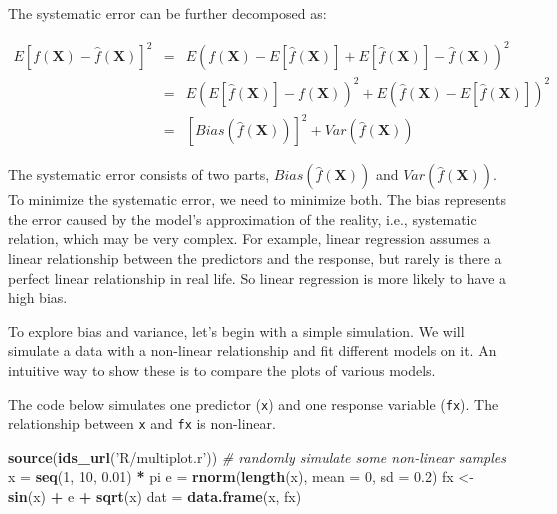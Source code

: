 \documentclass[12pt,]{krantz}
\makeatletter
\newenvironment{Shaded}{\begin{snugshade}}{\end{snugshade}}
\newcommand{\KeywordTok}[1]{\textcolor[rgb]{0.27,0.27,0.27}{\textbf{#1}}}
\newcommand{\DataTypeTok}[1]{\textcolor[rgb]{0.27,0.27,0.27}{#1}}
\newcommand{\DecValTok}[1]{\textcolor[rgb]{0.06,0.06,0.06}{#1}}
\newcommand{\FloatTok}[1]{\textcolor[rgb]{0.06,0.06,0.06}{#1}}
\newcommand{\StringTok}[1]{\textcolor[rgb]{0.5,0.5,0.5}{#1}}
\newcommand{\CommentTok}[1]{\textcolor[rgb]{0.37,0.37,0.37}{\textit{#1}}}
\newcommand{\OperatorTok}[1]{\textcolor[rgb]{0.43,0.43,0.43}{\textbf{#1}}}
\newcommand{\NormalTok}[1]{#1}
\newenvironment{kframe}{%
\medskip{}
\setlength{\fboxsep}{.8em}
 \def\at@end@of@kframe{}%
 \ifinner\ifhmode%
  \def\at@end@of@kframe{\end{minipage}}%
  \begin{minipage}{\columnwidth}%
 \fi\fi%
 \def\FrameCommand##1{\hskip\@totalleftmargin \hskip-\fboxsep
 \colorbox{shadecolor}{##1}\hskip-\fboxsep
     \hskip-\linewidth \hskip-\@totalleftmargin \hskip\columnwidth}%
 \MakeFramed {\advance\hsize-\width
   \@totalleftmargin\z@ \linewidth\hsize
   \@setminipage}}%
 {\par\unskip\endMakeFramed%
 \at@end@of@kframe}
\renewenvironment{Shaded}{\begin{kframe}}{\end{kframe}}
\theoremstyle{definition}
\theoremstyle{definition}
\theoremstyle{definition}
\theoremstyle{remark}
\makeatother
\begin{document}
The systematic error can be further decomposed as:

\[
\begin{array}{ccc}
E[f(\mathbf{X})-\hat{f}(\mathbf{X})]^{2} & = & E\left(f(\mathbf{X})-E[\hat{f}(\mathbf{X})]+E[\hat{f}(\mathbf{X})]-\hat{f}(\mathbf{X})\right)^{2}\\
 & = & E\left(E[\hat{f}(\mathbf{X})]-f(\mathbf{X})\right)^{2}+E\left(\hat{f}(\mathbf{X})-E[\hat{f}(\mathbf{X})]\right)^{2}\\
 & = & [Bias(\hat{f}(\mathbf{X}))]^{2}+Var(\hat{f}(\mathbf{X}))
\end{array}
\]

The systematic error consists of two parts,
\(Bias(\hat{f}(\mathbf{X}))\) and \(Var (\hat{f}(\mathbf{X}))\). To
minimize the systematic error, we need to minimize both. The bias
represents the error caused by the model's approximation of the reality,
i.e., systematic relation, which may be very complex. For example,
linear regression assumes a linear relationship between the predictors
and the response, but rarely is there a perfect linear relationship in
real life. So linear regression is more likely to have a high bias.

To explore bias and variance, let's begin with a simple simulation. We
will simulate a data with a non-linear relationship and fit different
models on it. An intuitive way to show these is to compare the plots of
various models.

The code below simulates one predictor (\texttt{x}) and one response
variable (\texttt{fx}). The relationship between \texttt{x} and
\texttt{fx} is non-linear.

\begin{Shaded}
\begin{Highlighting}[]
\KeywordTok{source}\NormalTok{(}\KeywordTok{ids_url}\NormalTok{(}\StringTok{'R/multiplot.r'}\NormalTok{))}
\CommentTok{# randomly simulate some non-linear samples}
\NormalTok{x =}\StringTok{ }\KeywordTok{seq}\NormalTok{(}\DecValTok{1}\NormalTok{, }\DecValTok{10}\NormalTok{, }\FloatTok{0.01}\NormalTok{) }\OperatorTok{*}\StringTok{ }\NormalTok{pi}
\NormalTok{e =}\StringTok{ }\KeywordTok{rnorm}\NormalTok{(}\KeywordTok{length}\NormalTok{(x), }\DataTypeTok{mean =} \DecValTok{0}\NormalTok{, }\DataTypeTok{sd =} \FloatTok{0.2}\NormalTok{)}
\NormalTok{fx <-}\StringTok{ }\KeywordTok{sin}\NormalTok{(x) }\OperatorTok{+}\StringTok{ }\NormalTok{e }\OperatorTok{+}\StringTok{ }\KeywordTok{sqrt}\NormalTok{(x)}
\NormalTok{dat =}\StringTok{ }\KeywordTok{data.frame}\NormalTok{(x, fx)}
\end{Highlighting}
\end{Shaded}
\end{document}
